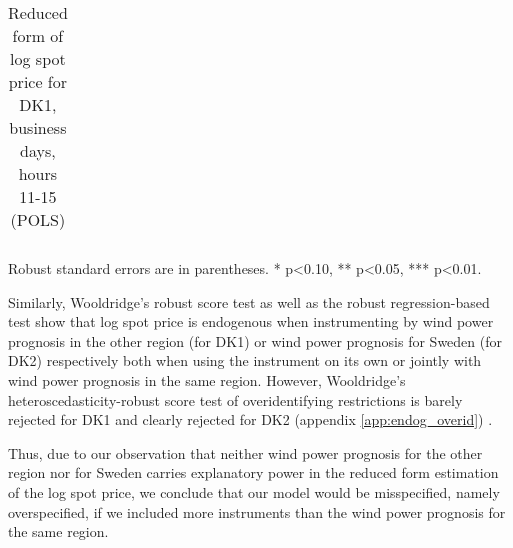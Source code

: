 \begin{table}[H]
\begin{threeparttable}
  \centering
  \caption{Reduced form of log spot price for DK1, business days, hours 11-15 (POLS)}
  \label{tab:reduced_form_price_dk1}
  \footnotesize
  \begin{tabular}{lcccc}
         
  \end{tabular}
    \begin{tablenotes}
        \item Robust standard errors are in parentheses. * p<0.10, ** p<0.05, *** p<0.01.
    \end{tablenotes}
\end{threeparttable}
\end{table}
Similarly, Wooldridge's robust score test as well as the robust regression-based test show that log spot price is endogenous when instrumenting by wind power prognosis in the other region (for DK1) or wind power prognosis for Sweden (for DK2) respectively both when using the instrument on its own or jointly with wind power prognosis in the same region. However, Wooldridge's heteroscedasticity-robust score test of overidentifying restrictions is barely rejected for DK1 and clearly rejected for DK2 (appendix \ref{app:endog_overid}) \citep{statacorp2017stata}.
\par
Thus, due to our observation that neither wind power prognosis for the other region nor for Sweden carries explanatory power in the reduced form estimation of the log spot price, we conclude that our model would be misspecified, namely overspecified, if we included more instruments than the wind power prognosis for the same region.


